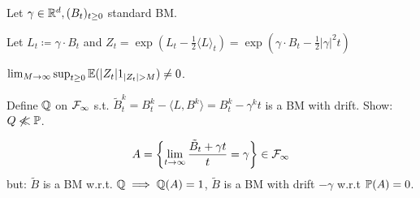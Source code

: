 \begin{aexample}
    Let $\gamma\in\mathbb{R}^d,(B_t)_{t\geq 0}$ standard BM. 

    Let $L_t\coloneqq \gamma\cdot B_t$ and $Z_t=\exp(L_t-\frac{1}{2}\langle L\rangle_t)=\exp(\gamma \cdot B_t-\frac{1}{2}|\gamma|^2t)$
    
\end{aexample}

\begin{remark}
    $\lim_{M\to\infty}\sup_{t\geq 0}\bE(|Z_t|1_{|Z_t|>M})\neq 0$.

    Define $\mathbb{Q}$ on $\mathcal{F}_\infty$ s.t. $\tilde{B}_t^k=B_t^k-\langle L,B^k\rangle=B_t^k-\gamma^kt$
    is a BM with drift. Show: $Q\not\ll\mathbb{P}$.

    \[A=\left\{\lim_{t\to\infty}\frac{\tilde{B}_t+\gamma t}{t}=\gamma\right\}\in\mathcal{F}_\infty\]
    but: $\tilde{B}$ is a BM w.r.t. $\mathbb{Q}\implies \mathbb{Q}(A)=1$, $\tilde{B}$ is a BM with drift $-\gamma$ w.r.t 
    $\mathbb{P}(A)=0$.


\end{remark}

